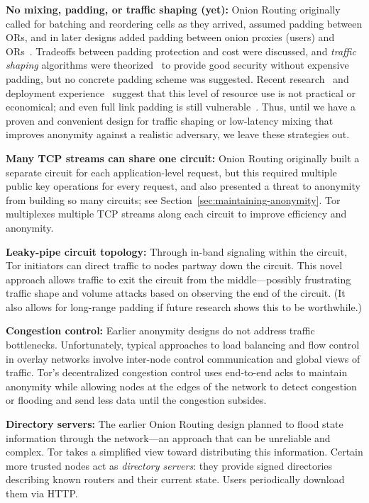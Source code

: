 \documentclass[times,10pt,twocolumn]{article}
\begin{document}
\textbf{No mixing, padding, or traffic shaping (yet):} Onion
Routing originally called for batching and reordering cells as they arrived,
assumed padding between ORs, and in
later designs added padding between onion proxies (users) and
ORs~\cite{or-ih96,or-jsac98}.  Tradeoffs between padding protection
and cost were discussed, and \emph{traffic shaping} algorithms were
theorized~\cite{or-pet00} to provide good security without expensive
padding, but no concrete padding scheme was suggested.
Recent research~\cite{econymics}
and deployment experience~\cite{freedom21-security} suggest that this
level of resource use is not practical or economical; and even full
link padding is still vulnerable~\cite{defensive-dropping}. Thus,
until we have a proven and convenient design for traffic shaping or
low-latency mixing that improves anonymity against a realistic
adversary, we leave these strategies out.

\textbf{Many TCP streams can share one circuit:} Onion Routing originally
built a separate circuit for each
application-level request, but this required
multiple public key operations for every request, and also presented
a threat to anonymity from building so many circuits; see
Section~\ref{sec:maintaining-anonymity}.  Tor multiplexes multiple TCP
streams along each circuit to improve efficiency and anonymity.

\textbf{Leaky-pipe circuit topology:} Through in-band signaling
within the circuit, Tor initiators can direct traffic to nodes partway
down the circuit. This novel approach
allows traffic to exit the circuit from the middle---possibly
frustrating traffic shape and volume attacks based on observing the end
of the circuit. (It also allows for long-range padding if
future research shows this to be worthwhile.)

\textbf{Congestion control:} Earlier anonymity designs do not
address traffic bottlenecks. Unfortunately, typical approaches to
load balancing and flow control in overlay networks involve inter-node
control communication and global views of traffic. Tor's decentralized
congestion control uses end-to-end acks to maintain anonymity
while allowing nodes at the edges of the network to detect congestion
or flooding and send less data until the congestion subsides.

\textbf{Directory servers:} The earlier Onion Routing design
planned to flood state information through the network---an approach
that can be unreliable and complex. %
Tor takes a simplified view toward distributing this
information. Certain more trusted nodes act as \emph{directory
servers}: they provide signed directories describing known
routers and their current state. Users periodically download them
via HTTP.
\end{document}
